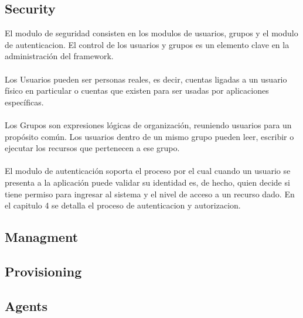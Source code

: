 \subsection{Security}
El modulo de seguridad consisten en los modulos de usuarios, grupos y el modulo de autenticacion. El control de los usuarios y grupos es un elemento clave en la administración del framework.\\
\\
Los Usuarios pueden ser personas reales, es decir, cuentas ligadas a un usuario físico en particular o cuentas que existen para ser usadas por aplicaciones específicas.\\
\\
Los Grupos son expresiones lógicas de organización, reuniendo usuarios para un propósito común. Los usuarios dentro de un mismo grupo pueden leer, escribir o ejecutar los recursos que pertenecen a ese grupo.\\
\\
El modulo de autenticación soporta el proceso por el cual cuando un usuario se presenta a la aplicación puede validar su identidad es, de hecho, quien decide si tiene permiso para ingresar al sistema y el nivel de acceso a un recurso dado. En el capitulo 4 se detalla el proceso de autenticacion y autorizacion.

\subsection{Managment}



\subsection{Provisioning}

\subsection{Agents}


